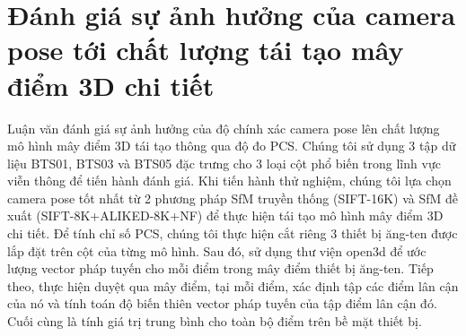 \section{Đánh giá sự ảnh hưởng của camera pose tới chất lượng tái tạo mây điểm 3D chi tiết}
\label{sec:eval_dense}
     Luận văn đánh giá sự ảnh hưởng của độ chính xác camera pose lên chất lượng mô hình mây điểm 3D tái tạo thông qua độ đo PCS. Chúng tôi sử dụng 3 tập dữ liệu BTS01, BTS03 và BTS05 đặc trưng cho 3 loại cột phổ biến trong lĩnh vực viễn thông để tiến hành đánh giá. Khi tiến hành thử nghiệm, chúng tôi lựa chọn camera pose tốt nhất từ 2 phương pháp SfM truyền thống (SIFT-16K) và SfM đề xuất (SIFT-8K+ALIKED-8K+NF) để thực hiện tái tạo mô hình mây điểm 3D chi tiết. Để tính chỉ số PCS, chúng tôi thực hiện cắt riêng 3 thiết bị ăng-ten được lắp đặt trên cột của từng mô hình. Sau đó, sử dụng thư viện open3d để ước lượng vector pháp tuyến cho mỗi điểm trong mây điểm thiết bị ăng-ten. Tiếp theo, thực hiện duyệt qua mây điểm, tại mỗi điểm, xác định tập các điểm lân cận của nó và tính toán độ biến thiên vector pháp tuyến của tập điểm lân cận đó. Cuối cùng là tính giá trị trung bình cho toàn bộ điểm trên bề mặt thiết bị.

     
